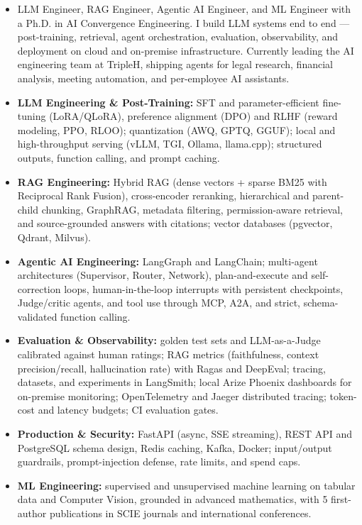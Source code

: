 \documentclass[11pt,a4paper]{article}
\begin{document}
\begin{itemize}
    \item LLM Engineer, RAG Engineer, Agentic AI Engineer, and ML Engineer with a Ph.D. in AI Convergence Engineering.
I build LLM systems end to end --- post-training, retrieval, agent orchestration, evaluation, observability, and
deployment on cloud and on-premise infrastructure. Currently leading the AI engineering team at TripleH, shipping
agents for legal research, financial analysis, meeting automation, and per-employee AI assistants.
    \item \textbf{LLM Engineering \& Post-Training:} SFT and parameter-efficient fine-tuning (LoRA/QLoRA), preference
alignment (DPO) and RLHF (reward modeling, PPO, RLOO); quantization (AWQ, GPTQ, GGUF); local and high-throughput
serving (vLLM, TGI, Ollama, llama.cpp); structured outputs, function calling, and prompt caching.
    \item \textbf{RAG Engineering:} Hybrid RAG (dense vectors + sparse BM25 with Reciprocal Rank Fusion), cross-encoder
reranking, hierarchical and parent-child chunking, GraphRAG, metadata filtering, permission-aware retrieval, and
source-grounded answers with citations; vector databases (pgvector, Qdrant, Milvus).
    \item \textbf{Agentic AI Engineering:} LangGraph and LangChain; multi-agent architectures (Supervisor, Router,
Network), plan-and-execute and self-correction loops, human-in-the-loop interrupts with persistent checkpoints,
Judge/critic agents, and tool use through MCP, A2A, and strict, schema-validated function calling.
    \item \textbf{Evaluation \& Observability:} golden test sets and LLM-as-a-Judge calibrated against human ratings;
RAG metrics (faithfulness, context precision/recall, hallucination rate) with Ragas and DeepEval; tracing, datasets,
and experiments in LangSmith; local Arize Phoenix dashboards for on-premise monitoring; OpenTelemetry and Jaeger
distributed tracing; token-cost and latency budgets; CI evaluation gates.
    \item \textbf{Production \& Security:} FastAPI (async, SSE streaming), REST API and PostgreSQL schema design, Redis
caching, Kafka, Docker; input/output guardrails, prompt-injection defense, rate limits, and spend caps.
    \item \textbf{ML Engineering:} supervised and unsupervised machine learning on tabular data and Computer Vision,
grounded in advanced mathematics, with 5 first-author publications in SCIE journals and international conferences.
\end{itemize}
\end{document}
